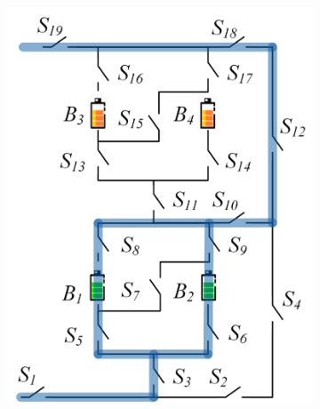 \documentclass{article}
\providecommand{\DIFaddbeginFL}{} %
\providecommand{\DIFaddendFL}{} %
\providecommand{\DIFdelbeginFL}{} %
\providecommand{\DIFdelendFL}{} %
\newcommand{\DIFscaledelfig}{0.5}
\newlength{\DIFdelgraphicswidth} %
\newlength{\DIFdelgraphicsheight} %
\newcommand{\DIFaddincludegraphics}[2][]{{\color{blue}\fbox{\DIFOincludegraphics[#1]{#2}}}} %
\newcommand{\DIFdelincludegraphics}[2][]{%
\sbox{\DIFdelgraphicsbox}{\DIFOincludegraphics[#1]{#2}}%
\settoboxwidth{\DIFdelgraphicswidth}{\DIFdelgraphicsbox} %
\settoboxtotalheight{\DIFdelgraphicsheight}{\DIFdelgraphicsbox} %
\scalebox{\DIFscaledelfig}{%
\parbox[b]{\DIFdelgraphicswidth}{\usebox{\DIFdelgraphicsbox}\\[-\baselineskip] \rule{\DIFdelgraphicswidth}{0em}}\llap{\resizebox{\DIFdelgraphicswidth}{\DIFdelgraphicsheight}{%
\setlength{\unitlength}{\DIFdelgraphicswidth}%
\begin{picture}(1,1)%
\thicklines\linethickness{2pt} %
{\color[rgb]{1,0,0}\put(0,0){\framebox(1,1){}}}%
{\color[rgb]{1,0,0}\put(0,0){\line( 1,1){1}}}%
{\color[rgb]{1,0,0}\put(0,1){\line(1,-1){1}}}%
\end{picture}%
}\hspace*{3pt}}} %
} %
\DeclareRobustCommand{\DIFaddbeginFL}{\DIFOaddbeginFL \let\includegraphics\DIFaddincludegraphics} %
\DeclareRobustCommand{\DIFaddendFL}{\DIFOaddendFL \let\includegraphics\DIFOincludegraphics} %
\DeclareRobustCommand{\DIFdelbeginFL}{\DIFOdelbeginFL \let\includegraphics\DIFdelincludegraphics} %
\DeclareRobustCommand{\DIFdelendFL}{\DIFOaddendFL \let\includegraphics\DIFOincludegraphics} %
\begin{document}
\begin{figure}[htbp]
\begin{subfigure}[b]{0.31\textwidth}
\DIFdelendFL \DIFaddbeginFL \includegraphics[width=\textwidth]{e2f2-isolate-2b.png}
        \DIFaddendFL \caption{}
        \label{fig:my-isolated-2b}
    \end{subfigure}
    \\
    \begin{subfigure}[b]{0.31\textwidth}
        \DIFdelbeginFL %

\end{subfigure}
\end{figure}
\end{document}
